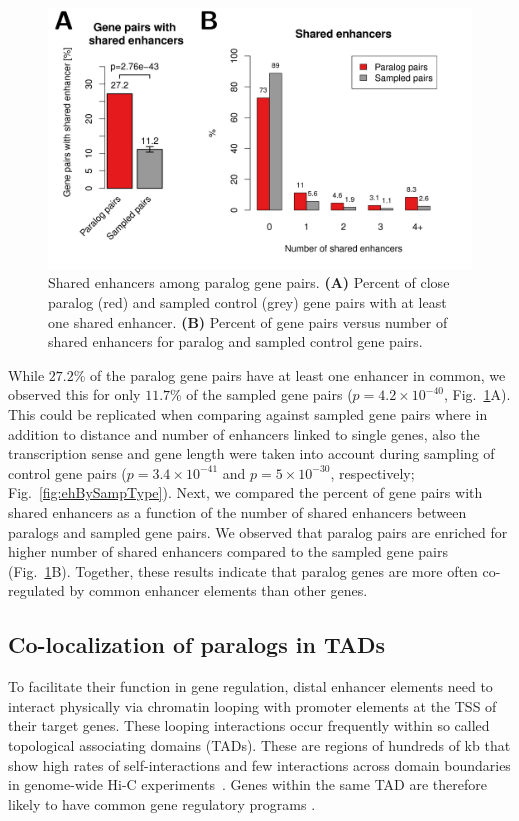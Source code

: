 \documentclass[a4paper,twoside=true,openright,parskip=full,chapterprefix=true,11pt,headings=normal,bibliography=totoc,listof=totoc,titlepage=on,captions=tableabove,draft=false]{scrreprt}
\theoremstyle{definition}
\theoremstyle{definition}
\theoremstyle{definition}
\theoremstyle{remark}
\begin{document}
\begin{figure}

{\centering \includegraphics[width=0.5\linewidth]{figures/paralog/fig2_09} 

}

\caption{Shared enhancers among paralog gene pairs.
\textbf{(A)} Percent of close paralog (red) and sampled control (grey)
gene pairs with at least one shared enhancer. \textbf{(B)} Percent of
gene pairs versus number of shared enhancers for paralog and sampled
control gene pairs.}\label{fig:sharedEnhancer}
\end{figure}







While \(27.2\)\% of the paralog gene pairs have at least one enhancer in
common, we observed this for only \(11.7\)\% of the sampled gene pairs
(\(p=4.2\times10^{-40}\), Fig.~\ref{fig:sharedEnhancer}A). This could be
replicated when comparing against sampled gene pairs where in addition
to distance and number of enhancers linked to single genes, also the
transcription sense and gene length were taken into account during
sampling of control gene pairs (\(p=3.4\times10^{-41}\) and
\(p=5\times10^{-30}\), respectively; Fig.~\ref{fig:ehBySampType}). Next,
we compared the percent of gene pairs with shared enhancers as a
function of the number of shared enhancers between paralogs and sampled
gene pairs. We observed that paralog pairs are enriched for higher
number of shared enhancers compared to the sampled gene pairs
(Fig.~\ref{fig:sharedEnhancer}B). Together, these results indicate that
paralog genes are more often co-regulated by common enhancer elements
than other genes.

\subsection{Co-localization of paralogs in
TADs}\label{co-localization-of-paralogs-in-tads}

To facilitate their function in gene regulation, distal enhancer
elements need to interact physically via chromatin looping with promoter
elements at the TSS of their target genes. These looping interactions
occur frequently within so called topological associating domains
(TADs). These are regions of hundreds of kb that show high rates of
self-interactions and few interactions across domain boundaries in
genome-wide Hi-C experiments~\citep{Dixon2012, Rao2014}. Genes within
the same TAD are therefore likely to have common gene regulatory
programs \citep{LeDily2014, Nora2012}.
\end{document}
